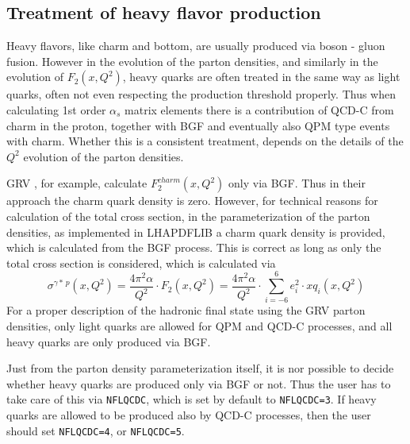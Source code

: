 \documentclass[10pt]{article} \usepackage{dina4}
\newcommand{\LHAPDFLIB}{Whalley:2005nh}
\begin{document}
\subsection{Treatment of heavy flavor production}
Heavy flavors, like charm and bottom, are usually produced via boson - gluon
fusion. However in the evolution of the parton densities, and similarly in the
evolution of $F_2(x,Q^2)$, heavy quarks are often treated in the same way as
light quarks, often not even respecting the production threshold properly.
Thus when calculating 1st order $\alpha_s$  matrix elements there is
a contribution of QCD-C from charm in the proton, together with BGF and
eventually also QPM type events with charm. 
Whether this is a consistent treatment, depends on the details of the $Q^2$
evolution of the parton densities.
\par
GRV \cite{GRVa,GRVb}, for example, calculate $F_2^{charm}(x,Q^2)$ only via BGF.
Thus in their approach the charm quark density is zero. However, for technical
reasons for calculation of the total cross section, in the parameterization of
the parton densities, as implemented in LHAPDFLIB \cite{\LHAPDFLIB}  a charm quark
density is provided, which is calculated from the BGF process. This is correct
as long as only the total cross section is considered, which is calculated via
\begin{equation}
\sigma ^{\gamma* \,p} (x,Q^2) = \frac{4 \pi^2 \alpha }{Q^2} \cdot F_2(x,Q^2) =
  \frac{4 \pi^2 \alpha }{Q^2} \cdot \sum_{i=-6}^6 e_i^2 \cdot xq_i(x,Q^2) 
\end{equation}
For a proper description of the hadronic final state 
using the GRV parton densities, only light quarks are
allowed for QPM and QCD-C processes, and all heavy quarks are only produced via
BGF. 
\par
Just from the parton density parameterization itself, it is nor possible to
decide whether heavy quarks are produced only via BGF or not. Thus the user has
to take care of this via \verb+NFLQCDC+, which is set by default to 
\verb+NFLQCDC=3+. If heavy quarks are allowed to be produced also by QCD-C
processes, then the user should set \verb+NFLQCDC=4+, or \verb+NFLQCDC=5+.


\end{document}
